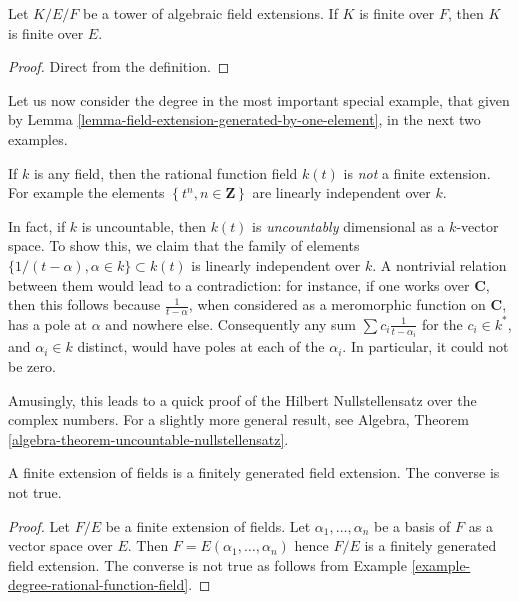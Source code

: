 \begin{lemma}
\label{lemma-finite-goes-up}
Let $K/E/F$ be a tower of algebraic field extensions.
If $K$ is finite over $F$, then $K$ is finite over $E$.
\end{lemma}

\begin{proof}
Direct from the definition.
\end{proof}

\noindent
Let us now consider the degree in the most important special example, that
given by Lemma \ref{lemma-field-extension-generated-by-one-element}, in the
next two examples.

\begin{example}
\label{example-degree-rational-function-field}
If $k$ is any field, then the rational function field $k(t)$ is
{\it not} a finite extension. For example the elements
$\left\{t^n, n \in \mathbf{Z}\right\}$ are linearly independent over $k$.

\medskip\noindent
In fact, if $k$ is uncountable, then $k(t)$ is {\it uncountably} dimensional
as a $k$-vector space. To show this, we claim that the family of elements
$\{1/(t- \alpha), \alpha \in k\} \subset k(t)$ is linearly independent over
$k$. A nontrivial relation between them would lead to a contradiction: for
instance, if one works over $\mathbf{C}$, then this follows because
$\frac{1}{t-\alpha}$, when considered as a meromorphic function on
$\mathbf{C}$, has a pole at $\alpha$ and nowhere else.
Consequently any sum $\sum c_i \frac{1}{t - \alpha_i}$ for the $c_i \in k^*$,
and $\alpha_i \in k$ distinct, would have poles at each of the $\alpha_i$.
In particular, it could not be zero.

\medskip\noindent
Amusingly, this leads to a quick proof of the Hilbert Nullstellensatz over
the complex numbers. For a slightly more general result, see
Algebra, Theorem \ref{algebra-theorem-uncountable-nullstellensatz}. 
\end{example}

\begin{lemma}
\label{lemma-finite-finitely-generated}
A finite extension of fields is a finitely generated field extension.
The converse is not true.
\end{lemma}

\begin{proof}
Let $F/E$ be a finite extension of fields. Let $\alpha_1, \ldots, \alpha_n$
be a basis of $F$ as a vector space over $E$. Then
$F = E(\alpha_1, \ldots, \alpha_n)$ hence $F/E$ is a finitely generated
field extension. The converse is not true as follows from
Example \ref{example-degree-rational-function-field}.
\end{proof}

